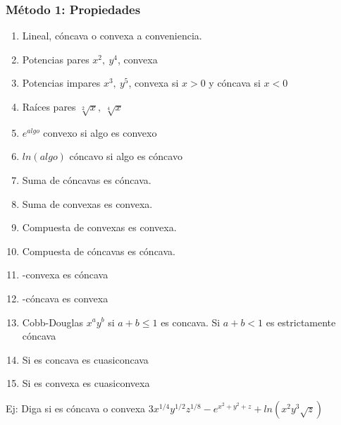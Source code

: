 \subsubsection{Método 1: Propiedades}
\begin{enumerate}
	\item Lineal, cóncava o convexa a conveniencia.
	\item Potencias pares $x^2,\ y^4$, convexa
	\item Potencias impares $x^3,\ y^5$, convexa si $x>0$ y cóncava si $x<0$
	\item Raíces pares $\sqrt[2]{x},\ \sqrt[4]{x}$
	\item $e^{algo}$ convexo si algo es convexo
	\item $ln(algo)$ cóncavo si algo es cóncavo
	\item Suma de cóncavas es cóncava.
	\item Suma de convexas es convexa.
	\item Compuesta de convexas es convexa.
	\item Compuesta de cóncavas es cóncava.
	\item -convexa es cóncava
	\item -cóncava es convexa
	\item Cobb-Douglas $x^ay^b$ si $a+b\leq1$ es concava. Si $a+b<1$ es estrictamente cóncava
	\item Si es concava es cuasiconcava
	\item Si es convexa es cuasiconvexa	
\end{enumerate}

Ej: Diga si es cóncava o convexa $3x^{1/4}y^{1/2}z^{1/8}-e^{x^2+y^2+z}+ln(x^2y^3\sqrt{z})$

